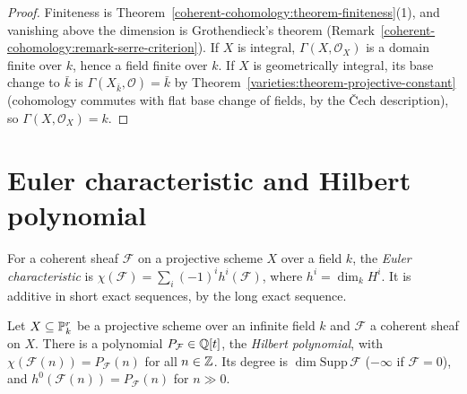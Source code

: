 \begin{proof}
Finiteness is Theorem~\ref{coherent-cohomology:theorem-finiteness}(1), and vanishing above the dimension is Grothendieck's theorem
(Remark~\ref{coherent-cohomology:remark-serre-criterion}). If $X$ is integral, $\Gamma(X, \mathcal{O}_X)$ is a domain finite over $k$, hence a field finite over $k$. If $X$
is geometrically integral, its base change to $\bar k$ is $\Gamma(X_{\bar k}, \mathcal{O}) = \bar k$ by Theorem~\ref{varieties:theorem-projective-constant}
(cohomology commutes with flat base change of fields, by the \v{C}ech description), so $\Gamma(X, \mathcal{O}_X) = k$.
\end{proof}

\section{Euler characteristic and Hilbert polynomial}\label{coherent-cohomology:section-hilbert}

\begin{definition}\label{coherent-cohomology:definition-euler}
For a coherent sheaf $\mathcal{F}$ on a projective scheme $X$ over a field $k$, the \emph{Euler characteristic} is $\chi(\mathcal{F}) = \sum_i(-1)^ih^i(\mathcal{F})$, where
$h^i = \dim_kH^i$. It is additive in short exact sequences, by the long exact sequence.
\end{definition}

\begin{theorem}\label{coherent-cohomology:theorem-hilbert-polynomial}
Let $X \subseteq \mathbb{P}^r_k$ be a projective scheme over an infinite field $k$ and $\mathcal{F}$ a coherent sheaf on $X$. There is a polynomial $P_\mathcal{F} \in \mathbb{Q}[t]$, the
\emph{Hilbert polynomial}, with $\chi(\mathcal{F}(n)) = P_\mathcal{F}(n)$ for all $n \in \mathbb{Z}$. Its degree is $\dim\mathrm{Supp}\,\mathcal{F}$ ($-\infty$ if $\mathcal{F} = 0$), and
$h^0(\mathcal{F}(n)) = P_\mathcal{F}(n)$ for $n \gg 0$.
\end{theorem}

